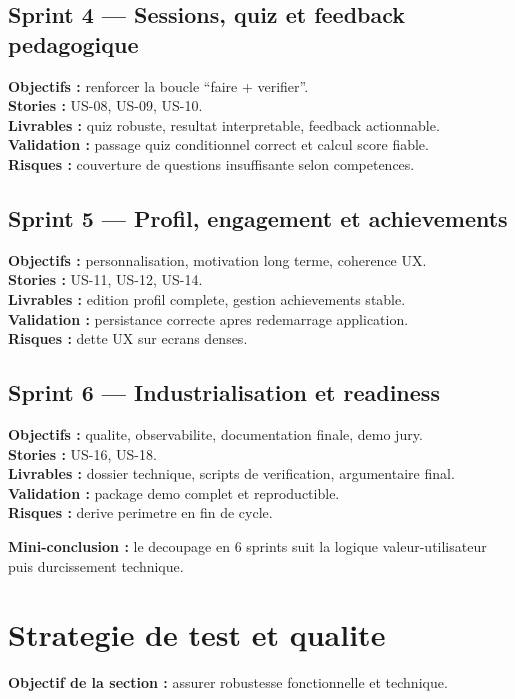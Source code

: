 \documentclass[12pt,a4paper]{article}
\begin{document}
\subsection*{Sprint 4 --- Sessions, quiz et feedback pedagogique}
\textbf{Objectifs :} renforcer la boucle ``faire + verifier''.\\
\textbf{Stories :} US-08, US-09, US-10.\\
\textbf{Livrables :} quiz robuste, resultat interpretable, feedback actionnable.\\
\textbf{Validation :} passage quiz conditionnel correct et calcul score fiable.\\
\textbf{Risques :} couverture de questions insuffisante selon competences.

\subsection*{Sprint 5 --- Profil, engagement et achievements}
\textbf{Objectifs :} personnalisation, motivation long terme, coherence UX.\\
\textbf{Stories :} US-11, US-12, US-14.\\
\textbf{Livrables :} edition profil complete, gestion achievements stable.\\
\textbf{Validation :} persistance correcte apres redemarrage application.\\
\textbf{Risques :} dette UX sur ecrans denses.

\subsection*{Sprint 6 --- Industrialisation et readiness}
\textbf{Objectifs :} qualite, observabilite, documentation finale, demo jury.\\
\textbf{Stories :} US-16, US-18.\\
\textbf{Livrables :} dossier technique, scripts de verification, argumentaire final.\\
\textbf{Validation :} package demo complet et reproductible.\\
\textbf{Risques :} derive perimetre en fin de cycle.

\textbf{Mini-conclusion :} le decoupage en 6 sprints suit la logique valeur-utilisateur puis durcissement technique.

\section{Strategie de test et qualite}
\textbf{Objectif de la section :} assurer robustesse fonctionnelle et technique.
\end{document}
